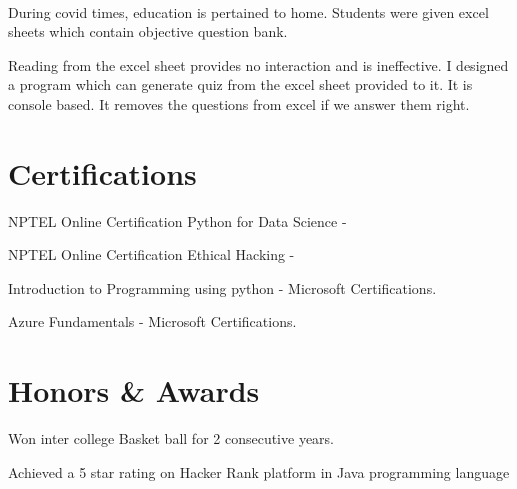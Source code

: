 \documentclass[]{deedy-resume-openfont}
\begin{document}
        
            \hfill {}\\
            \begin{tightemize}
\item  During covid times, education is pertained to home. Students were given excel sheets which contain objective question bank.
\item  Reading from the excel sheet provides no interaction and is ineffective. I designed a program which can generate quiz from the excel sheet provided to it. It is console based. It removes the questions from excel if we answer them right.
\end{tightemize}
            \sectionsep
%
%
\section{Certifications}
\vspace{4pt}
\begin{tightemize}
\item NPTEL Online Certification Python for Data Science - \\
\item NPTEL Online Certification Ethical Hacking - \\
\item Introduction to Programming using python - Microsoft Certifications.\\
\item Azure Fundamentals - Microsoft Certifications.\\
\end{tightemize}
\vspace{4pt}
%
%
\section{Honors \& Awards}
\vspace{4pt}
\begin{tightemize}
\item Won inter college Basket ball for 2 consecutive years.\\
\item Achieved a 5 star rating on Hacker Rank platform in Java programming language\\
\end{tightemize}
      \ 
      
\end{document}
